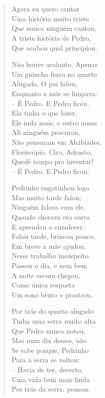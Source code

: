 \chapter*{}

\begin{verse}
Agora eu quero cantar\\
Uma história muito triste\\
Que nunca ninguém cantou,\\
A triste história de Pedro,\\
Que acabou qual principiou.

Não houve acalanto. Apenas\\
Um guincho fraco no quarto\\
Alugado. O pai falou,\\
Enquanto a mãe se limpava:\\
-- É Pedro. E Pedro ficou.\\
Ela tinha o que fazer,\\
Ele inda mais, e outro nome\\
Ali ninguém procurou,\\
Não pensaram em Alcibíades,\\
Floriscópio, Ciro, Adrasto,\\
Quedê tempo pra inventar!\\
-- É Pedro. E Pedro ficou.

Pedrinho engatinhou logo\\
Mas muito tarde falou;\\
Ninguém falava com ele,\\
Quando chorava era surra\\
E aprendeu a emudecer.\\
Falou tarde, brincou pouco,\\
Em breve a mãe ajudou.\\
Nesse trabalho insuspeito\\
Passou o dia, e nem bem\\
A noite escura chegou,\\
Como única resposta\\
Um sono bruto o prostrou.

Por trás do quarto alugado\\
Tinha uma serra muito alta\\
Que Pedro nunca notou,\\
Mas num dia desses, não\\
Se sabe porque, Pedrinho\\
Para a serra se voltou:\\
-- Havia de ter, decerto,\\
Uma vida bem mais linda\\
Por trás da serra, pensou.


\end{verse}
